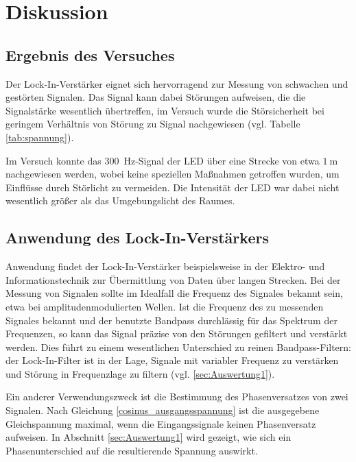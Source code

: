 \section{Diskussion}
\label{sec:Diskussion}

\subsection{Ergebnis des Versuches}
Der Lock-In-Verstärker eignet sich hervorragend zur Messung von schwachen und gestörten Signalen.
Das Signal kann dabei Störungen aufweisen, die die Signalstärke wesentlich übertreffen, im Versuch wurde die Störsicherheit bei geringem Verhältnis von Störung zu Signal nachgewiesen (vgl. Tabelle \ref{tab:spannung}).

Im Versuch konnte das \SI{300}{\hertz}-Signal der LED über eine Strecke von etwa $\SI{1}{\meter}$ nachgewiesen werden, wobei keine speziellen Maßnahmen getroffen wurden, um Einflüsse durch Störlicht zu vermeiden.
Die Intensität der LED war dabei nicht wesentlich größer als das Umgebungslicht des Raumes.

\subsection{Anwendung des Lock-In-Verstärkers}
Anwendung findet der Lock-In-Verstärker beispielsweise in der Elektro- und Informationstechnik zur Übermittlung von Daten über langen Strecken.
Bei der Messung von Signalen sollte im Idealfall die Frequenz des Signales bekannt sein, etwa bei amplitudenmodulierten Wellen.
Ist die Frequenz des zu messenden Signales bekannt und der benutzte Bandpass durchlässig für das Spektrum der Frequenzen, so kann das Signal präzise von den Störungen gefiltert und verstärkt werden.
Dies führt zu einem wesentlichen Unterschied zu reinen Bandpass-Filtern:
der Lock-In-Filter ist in der Lage, Signale mit variabler Frequenz zu verstärken und Störung in Frequenzlage zu filtern (vgl. \ref{sec:Auswertung1}). 

Ein anderer Verwendungszweck ist die Bestimmung des Phasenversatzes von zwei Signalen. 
Nach Gleichung \eqref{cosinus_ausgangsspannung} ist die ausgegebene Gleichspannung maximal, wenn die Eingangssignale keinen Phasenversatz aufweisen. 
In Abschnitt \ref{sec:Auswertung1} wird gezeigt, wie sich ein Phasenunterschied auf die resultierende Spannung auswirkt. 